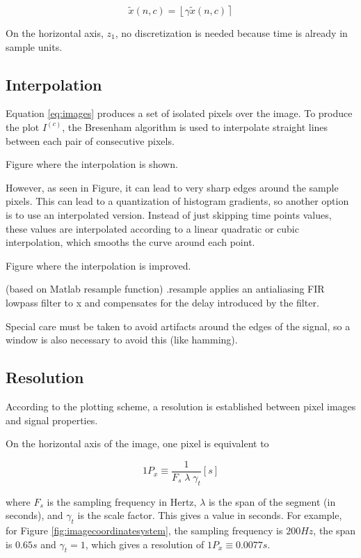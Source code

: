 \begin{equation}
\tilde{x}(n,c) = \left \lfloor{ \gamma  \tilde{x}(n,c)  }\right \rceil
\label{eq:standarizedaverages}
\end{equation}

On the horizontal axis, $z_1$, no discretization is needed because time is already in sample units. 

\subsection{Interpolation}

Equation \ref{eq:images} produces a set of isolated pixels over the image.  To produce the plot $I^{(c)}$, the Bresenham \cite{Bresenham1965,Ramele2016} algorithm is used to interpolate straight lines between each pair of consecutive pixels.

Figure where the interpolation is shown.

However, as seen in Figure, it can lead to very sharp edges around the sample pixels.  This can lead to a quantization of histogram gradients, so another option is to use an interpolated version.  Instead of just skipping time points values, these values are interpolated according to a linear quadratic or cubic interpolation, which smooths the curve around each point.

Figure where the interpolation is improved.

(based on Matlab resample function) .resample applies an antialiasing FIR lowpass filter to x and compensates for the delay introduced by the filter.

Special care must be taken to avoid artifacts around the edges of the signal, so a window is also necessary to avoid this (like hamming).

\subsection{Resolution}

According to the plotting scheme, a resolution is established between pixel images and signal properties.

On the horizontal axis of the image, one pixel is equivalent to 

\begin{equation}
1 P_x \equiv \frac{1}{F_s \; \lambda \; \gamma_t}  [\si{s}]
\label{eq:resolutionx}
\end{equation}

\noindent where $F_s$ is the sampling frequency in Hertz, $\lambda$ is the span of the segment (in seconds), and $\gamma_t$ is the scale factor.  This gives a value in seconds.  For example, for Figure \ref{fig:imagecoordinatesystem}, the sampling frequency is $200 Hz$, the span is $0.65 s$ and $\gamma_t = 1$, which gives a resolution of $1 P_x \equiv 0.0077 s$. 

